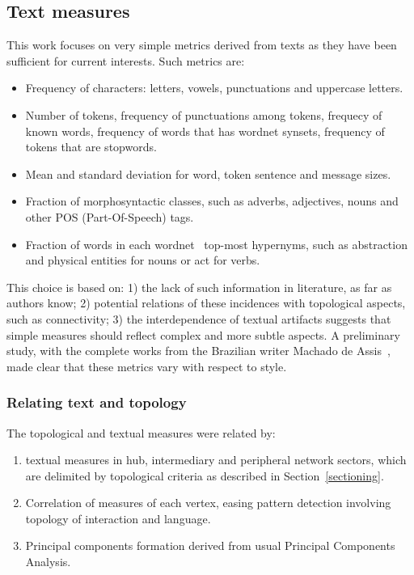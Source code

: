 \subsection{Text measures}
This work focuses on very simple metrics derived from texts as they have been sufficient for current interests.
Such metrics are:
\begin{itemize}
    \item Frequency of characters: letters, vowels, punctuations and uppercase letters.
    \item Number of tokens, frequency of punctuations among tokens, frequecy of known words, frequency of words that has wordnet synsets, frequency of tokens that are stopwords.
    \item Mean and standard deviation for word, token sentence and message sizes.
    \item Fraction of morphosyntactic classes, such as adverbs, adjectives, nouns and other POS (Part-Of-Speech) tags.
    \item Fraction of words in each wordnet~\cite{wordnet} top-most hypernyms,
	    such as abstraction and physical entities for nouns or act for verbs.
\end{itemize}

This choice is based on: 1) the lack of such information in literature, as far as authors know; 
2) potential relations of these incidences with topological aspects, such as connectivity;
3) the interdependence of textual artifacts suggests that simple measures should reflect complex and more subtle aspects.
A preliminary study, with the complete works from the Brazilian writer Machado de Assis~\cite{letrasMachado},
made clear that these metrics vary with respect to style.

\subsubsection{Relating text and topology}\label{sec:ks}
The topological and textual measures were related by:
\begin{enumerate}
	\item textual measures in hub, intermediary and peripheral network sectors, which are delimited by topological criteria as described in Section~\ref{sectioning}.
    \item Correlation of measures of each vertex, easing pattern detection involving topology of interaction and language.
    \item Principal components formation derived from usual Principal Components Analysis.
\end{enumerate}

